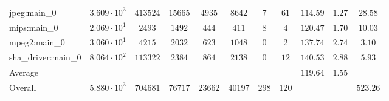 \begin{tabular}{|l|c|c|c|c|c|c|c|c|c|c|}
jpeg:main\_0            & $ 3.609 \cdot 10^{3}  $ & $ 413524 $ & $ 15665 $ & $ 4935  $ & $ 8642  $ & $ 7   $ & $ 61  $ & $ 114.59      $ & $ 1.27    $ & $ 28.58   $ \\
mips:main\_0            & $ 2.069 \cdot 10^{1}  $ & $ 2493   $ & $ 1492  $ & $ 444   $ & $ 411   $ & $ 8   $ & $ 4   $ & $ 120.47      $ & $ 1.70    $ & $ 10.03   $ \\
mpeg2:main\_0           & $ 3.060 \cdot 10^{1}  $ & $ 4215   $ & $ 2032  $ & $ 623   $ & $ 1048  $ & $ 0   $ & $ 2   $ & $ 137.74      $ & $ 2.74    $ & $ 3.10    $ \\
sha\_driver:main\_0     & $ 8.064 \cdot 10^{2}  $ & $ 113322 $ & $ 2384  $ & $ 864   $ & $ 2138  $ & $ 0   $ & $ 12  $ & $ 140.53      $ & $ 2.88    $ & $ 5.93    $ \\
\hline
Average                 & $                     $ & $        $ & $       $ & $       $ & $       $ & $     $ & $     $ & $ 119.64      $ & $ 1.55    $ & $         $ \\
\hline
Overall                 & $ 5.880 \cdot 10^{3}  $ & $ 704681 $ & $ 76717 $ & $ 23662 $ & $ 40197 $ & $ 298 $ & $ 120 $ & $             $ & $         $ & $ 523.26  $ \\
\hline
\end{tabular}
